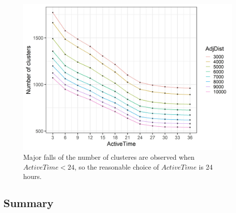 \begin{Schunk}
\begin{figure}

{\centering \includegraphics[width=0.8\linewidth]{figures/clustering_tuning_2} 

}

\caption[Major falls of the number of clusteres are observed when $ActiveTime < 24$, so the reasonable choice of $ActiveTime$ is 24 hours]{Major falls of the number of clusteres are observed when $ActiveTime < 24$, so the reasonable choice of $ActiveTime$ is 24 hours.}\label{fig:vis2}
\end{figure}
\end{Schunk}

\hypertarget{summary}{%
\subsection{Summary}\label{summary}}




\address{%
Weihao Li\\
Monash University\\%
Econometrics and Business Statistics\\
%
%
%
\\\href{mailto:weihao.li@monash.edu}{\nolinkurl{weihao.li@monash.edu}}
}

\address{%
Emily Dodwell\\
??\\%
line 1\\ line 2\\
%
%
%
\\\href{mailto:emdodwell@gmail.com}{\nolinkurl{emdodwell@gmail.com}}
}

\address{%
Dianne Cook\\
Monash University\\%
Econometrics and Business Statistics\\
%
%
%
\\\href{mailto:dicook@monash.edu}{\nolinkurl{dicook@monash.edu}}
}
